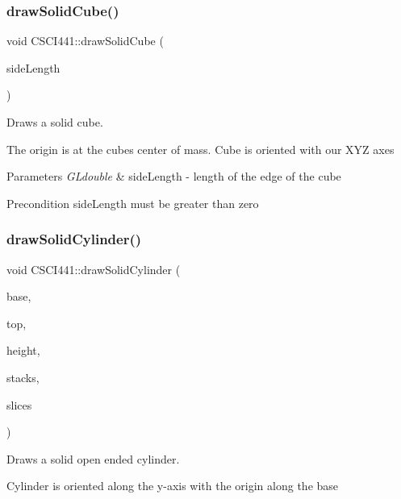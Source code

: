 \subsubsection{\texorpdfstring{draw\+Solid\+Cube()}{drawSolidCube()}}
{\footnotesize\ttfamily void C\+S\+C\+I441\+::draw\+Solid\+Cube (\begin{DoxyParamCaption}\item[{G\+Ldouble}]{side\+Length }\end{DoxyParamCaption})\hspace{0.3cm}{\ttfamily [inline]}}



Draws a solid cube. 

The origin is at the cube\textquotesingle{}s center of mass. Cube is oriented with our X\+YZ axes


\begin{DoxyParams}{Parameters}
{\em G\+Ldouble} & side\+Length -\/ length of the edge of the cube \\
\hline
\end{DoxyParams}
\begin{DoxyPrecond}{Precondition}
side\+Length must be greater than zero 
\end{DoxyPrecond}
\mbox{\label{namespace_c_s_c_i441_ae5fbc355c04fd762dcdda56a1954e2c6}} 
\subsubsection{\texorpdfstring{draw\+Solid\+Cylinder()}{drawSolidCylinder()}}
{\footnotesize\ttfamily void C\+S\+C\+I441\+::draw\+Solid\+Cylinder (\begin{DoxyParamCaption}\item[{G\+Ldouble}]{base,  }\item[{G\+Ldouble}]{top,  }\item[{G\+Ldouble}]{height,  }\item[{G\+Lint}]{stacks,  }\item[{G\+Lint}]{slices }\end{DoxyParamCaption})\hspace{0.3cm}{\ttfamily [inline]}}



Draws a solid open ended cylinder. 

Cylinder is oriented along the y-\/axis with the origin along the base


